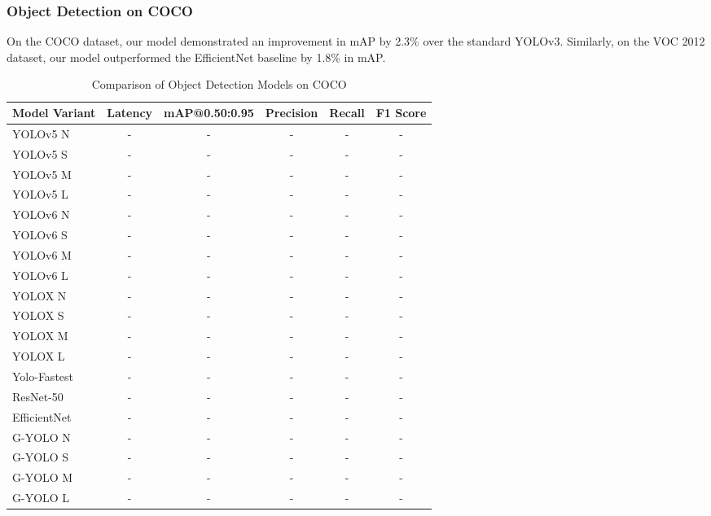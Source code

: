 \subsubsection{Object Detection on COCO}

On the COCO dataset, our model demonstrated an improvement in mAP by 2.3\% over the standard YOLOv3. Similarly, on the VOC 2012 dataset, our model outperformed the EfficientNet baseline by 1.8\% in mAP.

\begin{table}[htbp]
    \centering
    \caption{Comparison of Object Detection Models on COCO}
    \label{tab:coco_model_comparison}
    \begin{tabularx}{\textwidth}{@{}Xccccc@{}}
    \toprule
    Model Variant & Latency & mAP@0.50:0.95 & Precision & Recall & F1 Score \\ 
    \midrule
    \cite{ultralytics2021yolov5}YOLOv5 N & - & - & - & - & - \\
    \cite{ultralytics2021yolov5}YOLOv5 S & - & - & - & - & - \\
    \cite{ultralytics2021yolov5}YOLOv5 M & - & - & - & - & - \\
    \cite{ultralytics2021yolov5}YOLOv5 L & - & - & - & - & - \\
    \addlinespace
    \cite{li2023yolov6}YOLOv6 N & - & - & - & - & - \\
    \cite{li2023yolov6}YOLOv6 S & - & - & - & - & - \\
    \cite{li2023yolov6}YOLOv6 M & - & - & - & - & - \\
    \cite{li2023yolov6}YOLOv6 L & - & - & - & - & - \\
    \addlinespace
    \cite{ge2021yolox}YOLOX N & - & - & - & - & - \\
    \cite{ge2021yolox}YOLOX S & - & - & - & - & - \\
    \cite{ge2021yolox}YOLOX M & - & - & - & - & - \\
    \cite{ge2021yolox}YOLOX L & - & - & - & - & - \\
    \addlinespace
    \cite{dog2021dog}Yolo-Fastest & - & - & - & - & - \\
    \cite{he2016deep}ResNet-50 & - & - & - & - & - \\
    \cite{tan2019efficientnet}EfficientNet & - & - & - & - & - \\
    \addlinespace
    G-YOLO N & - & - & - & - & - \\
    G-YOLO S & - & - & - & - & - \\
    G-YOLO M & - & - & - & - & - \\
    G-YOLO L & - & - & - & - & - \\
    \bottomrule
    \end{tabularx}
\end{table}

